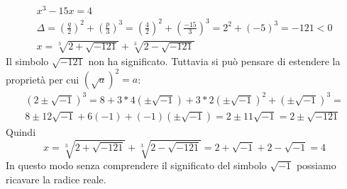 \begin{gather*}
	x^3 - 15x = 4 \\
	\Delta=\left(\frac{q}{2}\right)^2+\left(\frac{p}{3}\right)^3=\left(\frac{4}{2}\right)^2+\left(\frac{-15}{3}\right)^3=2^2+(-5)^3=-121 < 0 \\
	x=\sqrt[3]{2+\sqrt{-121}}+\sqrt[3]{2-\sqrt{-121}}
\end{gather*}
Il simbolo $\sqrt{-121}$ non ha significato. Tuttavia si può pensare di estendere la proprietà per cui $(\sqrt{a})^2=a$:
\begin{gather*}
	( 2 \pm \sqrt{-1} )^3 = 8 + 3*4( \pm \sqrt{-1} ) + 3*2( \pm \sqrt{-1} )^2 + ( \pm \sqrt{-1} )^3 = \\
	8 \pm 12\sqrt{-1} + 6(-1) + (-1)( \pm \sqrt{-1} ) = 2 \pm 11\sqrt{-1} = 2 \pm \sqrt{-121}
\end{gather*}
Quindi
\[
	x=\sqrt[3]{2+\sqrt{-121}}+\sqrt[3]{2-\sqrt{-121}}=2+\sqrt{-1}+2-\sqrt{-1}=4
\]
In questo modo senza comprendere il significato del simbolo $\sqrt{-1}$ possiamo ricavare la radice reale.
